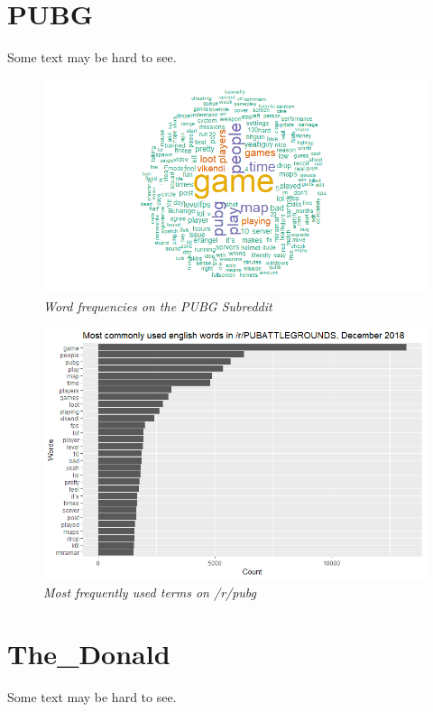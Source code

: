 \section{PUBG}
Some text may be hard to see.
\label{sec:pubg}
\begin{figure}[ht]
    \centering
    \includegraphics[width=1.0\textwidth]{graphs/PUBG/WordCloud_PUBG.png}
    \caption{\textit{Word frequencies on the PUBG Subreddit}}
    \label{fig:pubg_cloud}
\end{figure}

\begin{figure}[H]
    \centering
    \includegraphics[width=1.0\textwidth]{graphs/PUBG/WordFreq_PUBG.png}
    \caption{\textit{Most frequently used terms on /r/pubg}}
    \label{fig:pubg_wordfreq}
\end{figure}

\section{The\_Donald}
Some text may be hard to see.
\label{sec:thedonald}

